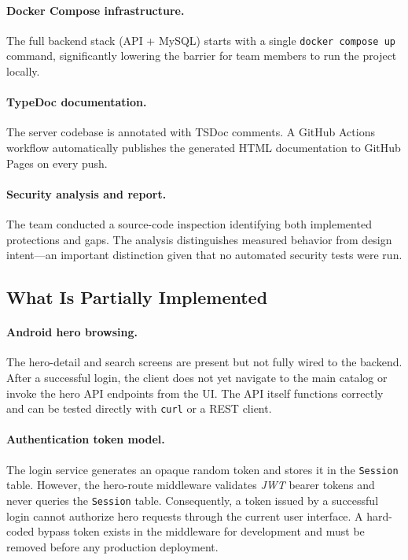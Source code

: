 \paragraph{Docker Compose infrastructure.}
The full backend stack (API + MySQL) starts with a single \texttt{docker compose up} command, significantly lowering the barrier for team members to run the project locally.

\paragraph{TypeDoc documentation.}
The server codebase is annotated with TSDoc comments. A GitHub Actions workflow automatically publishes the generated HTML documentation to GitHub Pages on every push.

\paragraph{Security analysis and report.}
The team conducted a source-code inspection identifying both implemented protections and gaps. The analysis distinguishes measured behavior from design intent---an important distinction given that no automated security tests were run.

\subsection{What Is Partially Implemented}

\paragraph{Android hero browsing.}
The hero-detail and search screens are present but not fully wired to the backend. After a successful login, the client does not yet navigate to the main catalog or invoke the hero API endpoints from the UI. The API itself functions correctly and can be tested directly with \texttt{curl} or a REST client.

\paragraph{Authentication token model.}
The login service generates an opaque random token and stores it in the \texttt{Session} table. However, the hero-route middleware validates \emph{JWT} bearer tokens and never queries the \texttt{Session} table. Consequently, a token issued by a successful login cannot authorize hero requests through the current user interface. A hard-coded bypass token exists in the middleware for development and must be removed before any production deployment.

